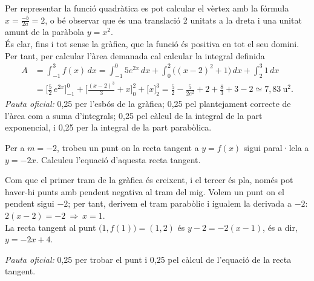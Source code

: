 \begin{apartats}
\begin{solucio}
\begin{center}
\end{center}
Per representar la funció quadràtica es pot calcular el vèrtex amb la fórmula
$x=\frac{-b}{2a}=2$, o bé observar que és una translació 2 unitats a la dreta i una unitat
amunt de la paràbola $y=x^2$.\\
És clar, fins i tot sense la gràfica, que la funció és positiva en tot el seu domini. Per
tant, per calcular l'àrea demanada cal calcular la integral definida
\begin{align*}
A&=\int_{-1}^{3}f(x)\,dx=\int_{-1}^{0}5e^{2x}\,dx+\int_{0}^{2}\big((x-2)^2+1\big)\,dx+\int_{2}^{3}1\,dx\\
 &=\Big[\tfrac52\,e^{2x}\Big]_{-1}^{0}+\Big[\tfrac{(x-2)^3}{3}+x\Big]_{0}^{2}+\Big[x\Big]_{2}^{3}
  =\frac52-\frac{5}{2e^2}+2+\frac83+3-2\simeq7{,}83\ \text{u}^2.
\end{align*}
\textit{Pauta oficial:} 0,25 per l'esbós de la gràfica; 0,25 pel plantejament correcte de
l'àrea com a suma d'integrals; 0,25 pel càlcul de la integral de la part exponencial, i
0,25 per la integral de la part parabòlica.
\end{solucio}

Per a $m=-2$, trobeu un punt on la recta tangent a $y=f(x)$ sigui paral·lela a $y=-2x$.
Calculeu l'equació d'aquesta recta tangent.

\begin{solucio}
Com que el primer tram de la gràfica és creixent, i el tercer és pla, només pot haver-hi
punts amb pendent negativa al tram del mig. Volem un punt on el pendent sigui $-2$; per
tant, derivem el tram parabòlic i igualem la derivada a $-2$:
$2(x-2)=-2\ \Rightarrow\ x=1$.\\
La recta tangent al punt $\big(1,f(1)\big)=(1,2)$ és $y-2=-2(x-1)$, és a dir, $y=-2x+4$.

\textit{Pauta oficial:} 0,25 per trobar el punt i 0,25 pel càlcul de l'equació de la recta
tangent.
\end{solucio}

\end{apartats}

